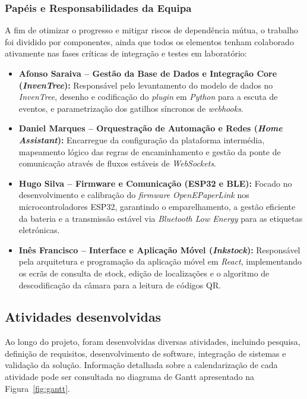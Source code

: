 \documentclass[10pt]{article}
\begin{document}
\subsubsection*{Papéis e Responsabilidades da Equipa}
A fim de otimizar o progresso e mitigar riscos de dependência mútua, o trabalho foi dividido por componentes, ainda que todos os elementos tenham colaborado ativamente nas fases críticas de integração e testes em laboratório:
\begin{itemize}
    \item \textbf{Afonso Saraiva -- Gestão da Base de Dados e Integração Core (\textit{InvenTree}):} Responsável pelo levantamento do modelo de dados no \textit{InvenTree}, desenho e codificação do \textit{plugin} em \textit{Python} para a escuta de eventos, e parametrização dos gatilhos síncronos de \textit{webhooks}.
    \item \textbf{Daniel Marques -- Orquestração de Automação e Redes (\textit{Home Assistant}):} Encarregue da configuração da plataforma intermédia, mapeamento lógico das regras de encaminhamento e gestão da ponte de comunicação através de fluxos estáveis de \textit{WebSockets}.
    \item \textbf{Hugo Silva -- Firmware e Comunicação (ESP32 e BLE):} Focado no desenvolvimento e calibração do \textit{firmware} \textit{OpenEPaperLink} nos microcontroladores ESP32, garantindo o emparelhamento, a gestão eficiente da bateria e a transmissão estável via \textit{Bluetooth Low Energy} para as etiquetas eletrónicas.
    \item \textbf{Inês Francisco -- Interface e Aplicação Móvel (\textit{Inkstock}):} Responsável pela arquitetura e programação da aplicação móvel em \textit{React}, implementando os ecrãs de consulta de stock, edição de localizações e o algoritmo de descodificação da câmara para a leitura de códigos QR.
\end{itemize}


\subsection{Atividades desenvolvidas}

Ao longo do projeto, foram desenvolvidas diversas atividades, incluindo 
pesquisa, definição de requisitos, desenvolvimento de software, integração 
de sistemas e validação da solução. Informação detalhada sobre a calendarização 
de cada atividade pode ser consultada no diagrama de Gantt apresentado na 
Figura~\ref{fig:gantt}.
\end{document}
